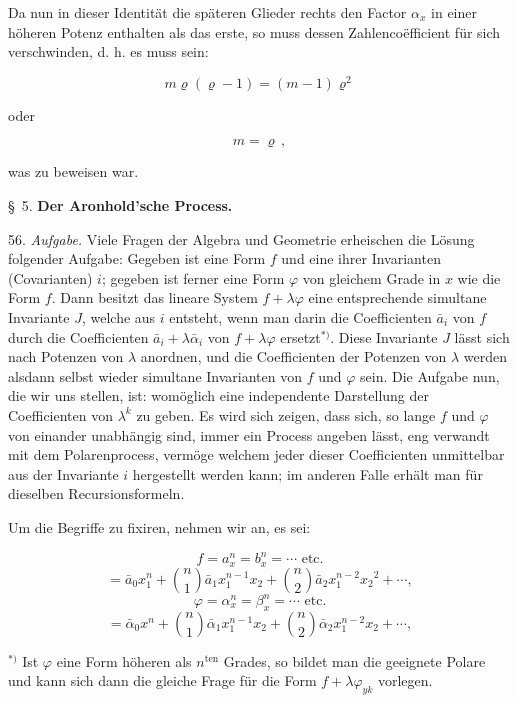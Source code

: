 \documentclass[11pt]{article}
\begin{document}
Da nun in dieser Identität die späteren Glieder rechts den Factor $\alpha_x$ in einer höheren Potenz enthalten als das erste, so muss dessen Zahlencoëfficient für sich verschwinden, d. h. es muss sein:

\[
m\varrho(\varrho-1) = (m-1)\varrho^2
\]

oder

\[
m = \varrho\,,
\]

was zu beweisen war.

\begin{center}
\S~5. \textbf{Der Aronhold'sche Process.}
\end{center}

56. \textit{Aufgabe.} Viele Fragen der Algebra und Geometrie erheischen die Lösung folgender Aufgabe: Gegeben ist eine Form $f$ und eine ihrer Invarianten (Covarianten) $i$; gegeben ist ferner eine Form $\varphi$ von gleichem Grade in $x$ wie die Form $f$. Dann besitzt das lineare System $f + \lambda\varphi$ eine entsprechende simultane Invariante $J$, welche aus $i$ entsteht, wenn man darin die Coefficienten $\bar a_i$ von $f$ durch die Coefficienten $\bar a_i + \lambda\bar\alpha_i$ von $f + \lambda\varphi$ ersetzt$^{*)}$. Diese Invariante $J$ lässt sich nach Potenzen von $\lambda$ anordnen, und die Coefficienten der Potenzen von $\lambda$ werden alsdann selbst wieder simultane Invarianten von $f$ und $\varphi$ sein. Die Aufgabe nun, die wir uns stellen, ist: womöglich eine independente Darstellung der Coefficienten von $\lambda^k$ zu geben. Es wird sich zeigen, dass sich, so lange $f$ und $\varphi$ von einander unabhängig sind, immer ein Process angeben lässt, eng verwandt mit dem Polarenprocess, vermöge welchem jeder dieser Coefficienten unmittelbar aus der Invariante $i$ hergestellt werden kann; im anderen Falle erhält man für dieselben Recursionsformeln.

Um die Begriffe zu fixiren, nehmen wir an, es sei:

\[
f = a_x^n = b_x^n = \cdots \text{ etc.}
\]
\[
= \bar a_0 x_1^n + \binom{n}{1}\bar a_1 x_1^{n-1}x_2 + \binom{n}{2}\bar a_2 x_1^{n-2}x_2{}^2 + \cdots,
\]
\[
\varphi = \alpha_x^n = \beta_x^n = \cdots \text{ etc.}
\]
\[
= \bar\alpha_0 x^n + \binom{n}{1}\bar\alpha_1 x_1^{n-1}x_2 + \binom{n}{2}\bar\alpha_2 x_1^{n-2}x_2 + \cdots, %
\]

\medskip
\noindent{}$^{*)}$ Ist $\varphi$ eine Form höheren als $n^{\text{ten}}$ Grades, so bildet man die geeignete Polare und kann sich dann die gleiche Frage für die Form $f + \lambda\varphi_{yk}$ vorlegen.
\end{document}
